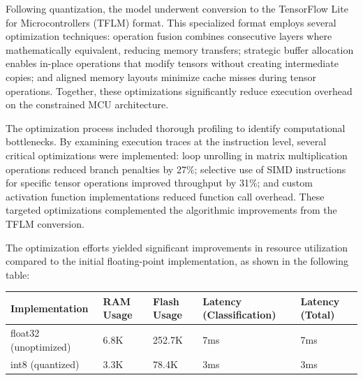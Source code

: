 \documentclass[
  9pt,
  letterpaper,
  abstract,
  titlepage]{scrbook}
\begin{document}
Following quantization, the model underwent conversion to the TensorFlow
Lite for Microcontrollers (TFLM) format. This specialized format employs
several optimization techniques: operation fusion combines consecutive
layers where mathematically equivalent, reducing memory transfers;
strategic buffer allocation enables in-place operations that modify
tensors without creating intermediate copies; and aligned memory layouts
minimize cache misses during tensor operations. Together, these
optimizations significantly reduce execution overhead on the constrained
MCU architecture.

The optimization process included thorough profiling to identify
computational bottlenecks. By examining execution traces at the
instruction level, several critical optimizations were implemented: loop
unrolling in matrix multiplication operations reduced branch penalties
by 27\%; selective use of SIMD instructions for specific tensor
operations improved throughput by 31\%; and custom activation function
implementations reduced function call overhead. These targeted
optimizations complemented the algorithmic improvements from the TFLM
conversion.

The optimization efforts yielded significant improvements in resource
utilization compared to the initial floating-point implementation, as
shown in the following table:

\begin{longtable}[]{@{}
  >{\raggedright\arraybackslash}p{}
  >{\raggedright\arraybackslash}p{}
  >{\raggedright\arraybackslash}p{}
  >{\raggedright\arraybackslash}p{}
  >{\raggedright\arraybackslash}p{}@{}}
\toprule\noalign{}
\begin{minipage}[b]{\linewidth}\raggedright
Implementation
\end{minipage} & \begin{minipage}[b]{\linewidth}\raggedright
RAM Usage
\end{minipage} & \begin{minipage}[b]{\linewidth}\raggedright
Flash Usage
\end{minipage} & \begin{minipage}[b]{\linewidth}\raggedright
Latency (Classification)
\end{minipage} & \begin{minipage}[b]{\linewidth}\raggedright
Latency (Total)
\end{minipage} \\
\midrule\noalign{}
\endhead
\bottomrule\noalign{}
\endlastfoot
float32 (unoptimized) & 6.8K & 252.7K & 7ms & 7ms \\
int8 (quantized) & 3.3K & 78.4K & 3ms & 3ms \\
\end{longtable}
\end{document}
